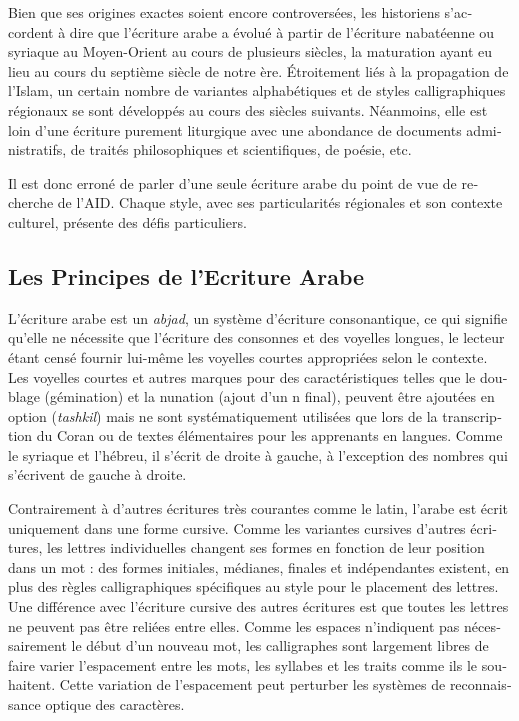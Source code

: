 \begin{french}
Bien que ses origines exactes soient encore controversées, les historiens
s'accordent à dire que l'écriture arabe a évolué à partir de l'écriture
nabatéenne ou syriaque au Moyen-Orient au cours de plusieurs siècles, la
maturation ayant eu lieu au cours du septième siècle de notre ère.  Étroitement
liés à la propagation de l'Islam, un certain nombre de variantes alphabétiques
et de styles calligraphiques régionaux se sont développés au cours des siècles
suivants. Néanmoins, elle est loin d'une écriture purement liturgique avec une
abondance de documents administratifs, de traités philosophiques et
scientifiques, de poésie, etc.

Il est donc erroné de parler d'une seule écriture arabe du point de vue de
recherche de l'AID. Chaque style, avec ses particularités
régionales et son contexte culturel, présente des défis particuliers.

\subsection{Les Principes de l'Ecriture Arabe}

L'écriture arabe est un \emph{abjad}, un système d'écriture consonantique, ce qui
signifie qu'elle ne nécessite que l'écriture des consonnes et des voyelles
longues, le lecteur étant censé fournir lui-même les voyelles courtes
appropriées selon le contexte. Les voyelles courtes et autres marques pour des
caractéristiques telles que le doublage (gémination) et la nunation (ajout d'un
n final), peuvent être ajoutées en option (\emph{tashkil}) mais ne sont
systématiquement utilisées que lors de la transcription du Coran ou de textes
élémentaires pour les apprenants en langues. Comme le syriaque et l'hébreu, il
s'écrit de droite à gauche, à l'exception des nombres qui s'écrivent de gauche
à droite.

Contrairement à d'autres écritures très courantes comme le latin, l'arabe est
écrit uniquement dans une forme cursive. Comme les variantes cursives d'autres
écritures, les lettres individuelles changent ses formes en fonction de leur
position dans un mot : des formes initiales, médianes, finales et indépendantes
existent, en plus des règles calligraphiques spécifiques au style pour le
placement des lettres. Une différence avec l'écriture cursive des autres
écritures est que toutes les lettres ne peuvent pas être reliées entre elles.
Comme les espaces n'indiquent pas nécessairement le début d'un nouveau mot, les
calligraphes sont largement libres de faire varier l'espacement entre les mots,
les syllabes et les traits comme ils le souhaitent.  Cette variation de
l'espacement peut perturber les systèmes de reconnaissance optique des
caractères.


\end{french}
